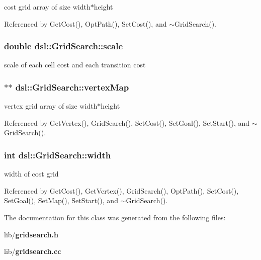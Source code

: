 cost grid array of size width$\ast$height 



Referenced by Get\-Cost(), Opt\-Path(), Set\-Cost(), and $\sim$\-Grid\-Search().

\subsubsection[{scale}]{\setlength{\rightskip}{0pt plus 5cm}double dsl\-::\-Grid\-Search\-::scale}\label{classdsl_1_1GridSearch_af0815d65f819f2fb60d4e10b67c864f0}


scale of each cell cost and each transition cost 

\subsubsection[{vertex\-Map}]{$\ast$$\ast$ dsl\-::\-Grid\-Search\-::vertex\-Map\hspace{0.3cm}{\ttfamily [protected]}}\label{classdsl_1_1GridSearch_aed8a4e7a0992fc9f9890b935a9182900}


vertex grid array of size width$\ast$height 



Referenced by Get\-Vertex(), Grid\-Search(), Set\-Cost(), Set\-Goal(), Set\-Start(), and $\sim$\-Grid\-Search().

\subsubsection[{width}]{\setlength{\rightskip}{0pt plus 5cm}int dsl\-::\-Grid\-Search\-::width}\label{classdsl_1_1GridSearch_a00f5f3859a75f31e0312697e702cfc98}


width of cost grid 



Referenced by Get\-Cost(), Get\-Vertex(), Grid\-Search(), Opt\-Path(), Set\-Cost(), Set\-Goal(), Set\-Map(), Set\-Start(), and $\sim$\-Grid\-Search().



The documentation for this class was generated from the following files\-:\begin{DoxyCompactItemize}
\item 
lib/{\bf gridsearch.\-h}\item 
lib/{\bf gridsearch.\-cc}\end{DoxyCompactItemize}
